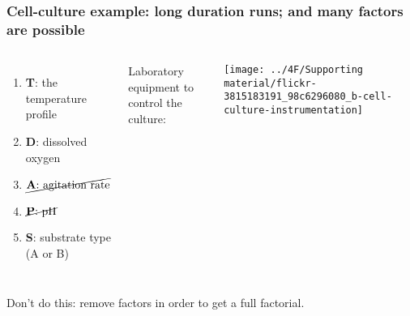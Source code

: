 \begin{frame}\frametitle{Cell-culture example: long duration runs; and many factors are possible}
	\begin{columns}[c]
			\begin{enumerate}
				\item	\textbf{T}: the temperature profile
				\item	\textbf{D}: dissolved oxygen
				\item	$\cancel{\text{\textbf{A}: agitation rate}}$
				\item	$\cancel{\text{\textbf{P}: pH}}$
				\item	\textbf{S}: substrate type (A or B)
			\end{enumerate}
		
			{\color{blue} \small Laboratory equipment to control the culture:} 
			
			\vspace{0.2cm}
			
			\centerline{\texttt{[image: ../4F/Supporting material/flickr-3815183191\_98c6296080\_b-cell-culture-instrumentation]}}
	\end{columns}

	\vfill
	{\color{red} Don't do this:} remove factors in order to get a full factorial.
	
\end{frame}

